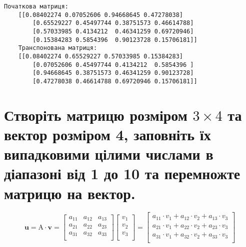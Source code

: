 \documentclass[]{article}
\newcounter{in}
\begin{document}
\begin{Verbatim}[commandchars=\\\{\}]
	Початкова матриця:
	[[0.08402274 0.07052606 0.94668645 0.47278038]
		[0.65529227 0.45497744 0.38751573 0.46614788]
		[0.57033985 0.4134212  0.46341259 0.69720946]
		[0.15384283 0.5854396  0.90123728 0.15706181]]
	Транспонована матриця:
	[[0.08402274 0.65529227 0.57033985 0.15384283]
		[0.07052606 0.45497744 0.4134212  0.5854396 ]
		[0.94668645 0.38751573 0.46341259 0.90123728]
		[0.47278038 0.46614788 0.69720946 0.15706181]]
\end{Verbatim}

\section{\texorpdfstring{Створіть матрицю розміром \(3\times4\) та вектор розміром 4, заповніть їх випадковими цілими числами в діапазоні від 1 до 10 та перемножте матрицю на
		вектор.}{Створіть матрицю розміром 3\textbackslash times4 та вектор розміром 4, заповніть їх випадковими цілими числами в діапазоні від 1 до 10 та перемножте матрицю на вектор.}}
\[
	\mathbf{u} = \mathrm{A} \cdot \mathbf{v} =
	\begin{bmatrix}
		a_{11} & a_{12} & a_{13} \\
		a_{21} & a_{22} & a_{23} \\
		a_{31} & a_{32} & a_{33} \\
	\end{bmatrix}
	\begin{bmatrix}
		v_1 \\
		v_2 \\
		v_3 \\
	\end{bmatrix}
	=
	\begin{bmatrix}
		a_{11} \cdot v_1 + a_{12} \cdot v_2 + a_{13} \cdot v_3 \\
		a_{21} \cdot v_1 + a_{22} \cdot v_2 + a_{23} \cdot v_3 \\
		a_{31} \cdot v_1 + a_{32} \cdot v_2 + a_{33} \cdot v_3 \\
	\end{bmatrix}
\]
\end{document}
